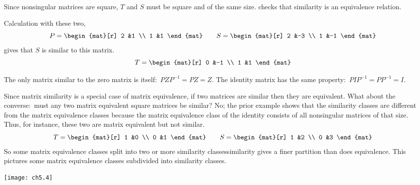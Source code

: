 \noindent Since nonsingular matrices are square, 
$T$ and $S$ must
be square and of the same size.
 checks that
similarity is an equivalence relation.

\begin{example}
Calculation with these two,
\begin{equation*}
  P=
  \begin{mat}[r]
    2  &1  \\
    1  &1
  \end{mat}
  \qquad
  S=
  \begin{mat}[r]
    2  &-3  \\
    1  &-1
  \end{mat}
\end{equation*}
gives that $S$ is similar to this matrix.
\begin{equation*}
  T=
  \begin{mat}[r]
    0  &-1  \\
    1  &1
  \end{mat}
\end{equation*}
\end{example}

\begin{example}  \label{ex:OnlyZeroSimToZero}
The only matrix similar to the zero matrix is itself:~$PZP^{-1}=PZ=Z$.
The identity matrix has the same property:~$PIP^{-1}=PP^{-1}=I$.
\end{example}

Since matrix similarity is a special case of matrix equivalence, 
if two matrices are similar then they are equivalent.
What about the converse:~must any two matrix equivalent square matrices be 
similar?
No;
the prior example shows that the similarity classes are different
from the matrix equivalence classes because the matrix equivalence class
of the identity consists of all nonsingular matrices of that size. 
Thus, for instance, these two are
matrix equivalent but not similar.
\begin{equation*}
  T=
  \begin{mat}[r]
    1  &0  \\
    0  &1
  \end{mat}
  \qquad
  S=
  \begin{mat}[r]
    1  &2  \\
    0  &3
  \end{mat}
\end{equation*}
So some matrix equivalence classes
split into two or more similarity classes\Dash similarity gives a finer
partition than does equivalence.
This pictures some matrix equivalence classes subdivided into
similarity classes.
\begin{center}
  \texttt{[image: ch5.4]}
\end{center}

